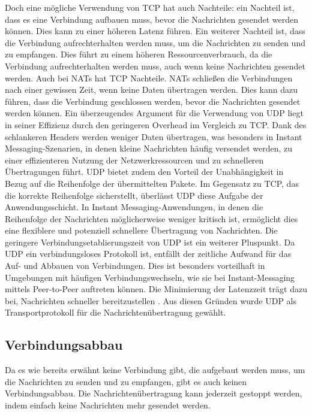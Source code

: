 Doch eine mögliche Verwendung von TCP hat auch Nachteile: ein Nachteil ist, dass es eine Verbindung aufbauen muss, bevor die Nachrichten gesendet werden können. Dies kann zu einer höheren Latenz führen. Ein weiterer Nachteil ist, dass die Verbindung aufrechterhalten werden muss, um die Nachrichten zu senden und zu empfangen. Dies führt zu einem höheren Ressourcenverbrauch, da die Verbindung aufrechterhalten werden muss, auch wenn keine Nachrichten gesendet werden. Auch bei NATs hat TCP Nachteile. NATs schließen die Verbindungen nach einer gewissen Zeit, wenn keine Daten übertragen werden. Dies kann dazu führen, dass die Verbindung geschlossen werden, bevor die Nachrichten gesendet werden können. 
Ein überzeugendes Argument für die Verwendung von UDP liegt in seiner Effizienz durch den geringeren Overhead im Vergleich zu TCP. Dank des schlankeren Headers werden weniger Daten übertragen, was besonders in Instant Messaging-Szenarien, in denen kleine Nachrichten häufig versendet werden, zu einer effizienteren Nutzung der Netzwerkressourcen und zu schnelleren Übertragungen führt. UDP bietet zudem den Vorteil der Unabhängigkeit in Bezug auf die Reihenfolge der übermittelten Pakete. Im Gegensatz zu TCP, das die korrekte Reihenfolge sicherstellt, überlässt UDP diese Aufgabe der Anwendungsschicht. In Instant Messaging-Anwendungen, in denen die Reihenfolge der Nachrichten möglicherweise weniger kritisch ist, ermöglicht dies eine flexiblere und potenziell schnellere Übertragung von Nachrichten. Die geringere Verbindungsetablierungszeit von UDP ist ein weiterer Pluspunkt. Da UDP ein verbindungsloses Protokoll ist, entfällt der zeitliche Aufwand für das Auf- und Abbauen von Verbindungen. Dies ist besonders vorteilhaft in Umgebungen mit häufigen Verbindungswechseln, wie sie bei Instant-Messaging mittels Peer-to-Peer auftreten können. Die Minimierung der Latenzzeit trägt dazu bei, Nachrichten schneller bereitzustellen \parencites{rfc768_UDP}{rfc9293_TCP}. 
Aus diesen Gründen wurde UDP als Transportprotokoll für die Nachrichtenübertragung gewählt.


\subsection{Verbindungsabbau}

Da es wie bereits erwähnt keine Verbindung gibt, die aufgebaut werden muss, um die Nachrichten zu senden und zu empfangen, gibt es auch keinen Verbindungsabbau. Die Nachrichtenübertragung kann jederzeit gestoppt werden, indem einfach keine Nachrichten mehr gesendet werden. 